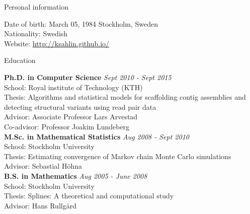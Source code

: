 \documentclass{resume} %
\begin{document}

\begin{rSection}{Personal information}

Date of birth: March 05, 1984 Stockholm, Sweden\\
Nationality: Swedish\\
Website: \url{http://ksahlin.github.io/}\\
\end{rSection}


\begin{rSection}{Education}

{\bf Ph.D. in Computer Science} \hfill {\em Sept 2010 - Sept 2015} \\ 
School: Royal institute of Technology (KTH) \\
Thesis: Algorithms and statistical models for scaffolding contig assemblies and detecting structural variants using read pair data \\
Advisor: Associate Professor Lars Arvestad\\
Co-advisor: Professor Joakim Lundeberg\\
{\bf M.Sc. in Mathematical Statistics} \hfill {\em Aug 2008 - Sept 2010} \\ 
School: Stockholm University \\
Thesis: Estimating convergence of Markov chain 
Monte Carlo simulations\\
Advisor: Sebastial H\"{o}hna\\
{\bf B.S. in Mathematics} \hfill {\em Aug 2005 - June 2008} \\ 
School: Stockholm University \\
Thesis: Splines: A theoretical and computational study\\
Advisor: Hans Rullg\r{a}rd\\
\end{rSection}

\end{document}
